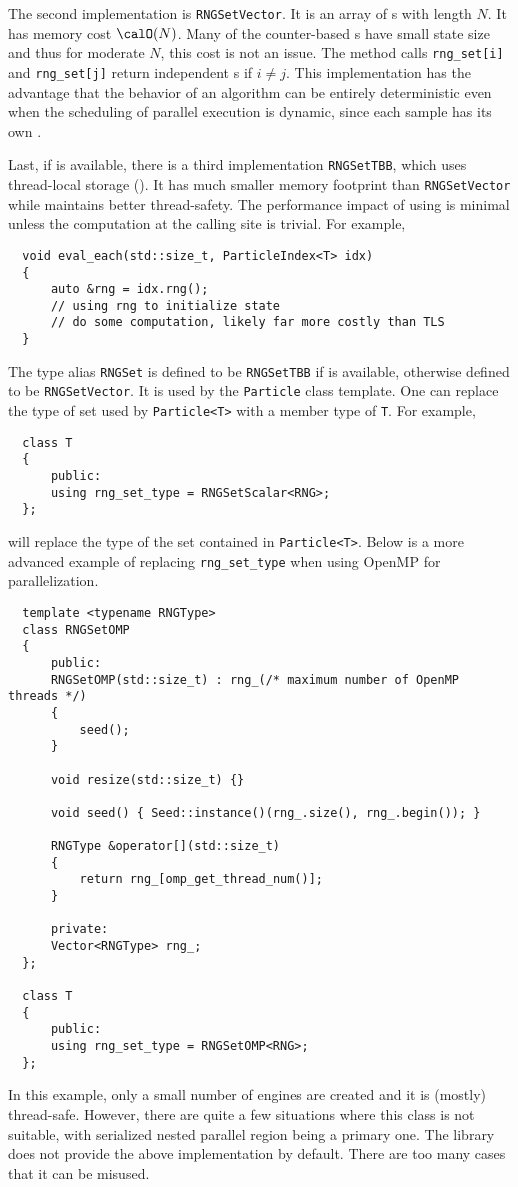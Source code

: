 The second implementation is \verb|RNGSetVector|. It is an array of \rng{}s
with length $N$. It has memory cost $\calO(N)$. Many of the counter-based
\rng{}s have small state size and thus for moderate $N$, this cost is not an
issue. The method calls \verb|rng_set[i]| and \verb|rng_set[j]| return
independent \rng{}s if $i \ne j$. This implementation has the advantage that
the behavior of an algorithm can be entirely deterministic even when the
scheduling of parallel execution is dynamic, since each sample has its own
\rng.

Last, if \tbb is available, there is a third implementation \verb|RNGSetTBB|,
which uses thread-local storage (\tls). It has much smaller memory footprint
than \verb|RNGSetVector| while maintains better thread-safety. The performance
impact of using \tls is minimal unless the computation at the calling site is
trivial. For example,
\begin{Verbatim}
  void eval_each(std::size_t, ParticleIndex<T> idx)
  {
      auto &rng = idx.rng();
      // using rng to initialize state
      // do some computation, likely far more costly than TLS
  }
\end{Verbatim}
The type alias \verb|RNGSet| is defined to be \verb|RNGSetTBB| if \tbb is
available, otherwise defined to be \verb|RNGSetVector|. It is used by the
\verb|Particle| class template. One can replace the type of \rng set used by
\verb|Particle<T>| with a member type of \verb|T|. For example,
\begin{Verbatim}
  class T
  {
      public:
      using rng_set_type = RNGSetScalar<RNG>;
  };
\end{Verbatim}
will replace the type of the \rng set contained in \verb|Particle<T>|. Below is
a more advanced example of replacing \verb|rng_set_type| when using OpenMP for
parallelization.
\begin{Verbatim}
  template <typename RNGType>
  class RNGSetOMP
  {
      public:
      RNGSetOMP(std::size_t) : rng_(/* maximum number of OpenMP threads */)
      {
          seed();
      }

      void resize(std::size_t) {}

      void seed() { Seed::instance()(rng_.size(), rng_.begin()); }

      RNGType &operator[](std::size_t)
      {
          return rng_[omp_get_thread_num()];
      }

      private:
      Vector<RNGType> rng_;
  };

  class T
  {
      public:
      using rng_set_type = RNGSetOMP<RNG>;
  };
\end{Verbatim}
In this example, only a small number of \rng{} engines are created and it is
(mostly) thread-safe. However, there are quite a few situations where this
class is not suitable, with serialized nested parallel region being a primary
one. The library does not provide the above implementation by default. There
are too many cases that it can be misused.

